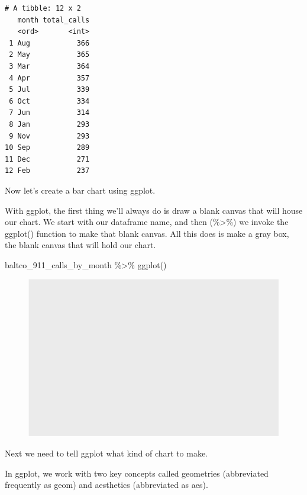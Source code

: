 \documentclass[
  letterpaper,
  DIV=11,
  numbers=noendperiod]{scrreprt}
\newenvironment{Shaded}{\begin{snugshade}}{\end{snugshade}}
\newcommand{\FunctionTok}[1]{\textcolor[rgb]{0.28,0.35,0.67}{#1}}
\newcommand{\NormalTok}[1]{\textcolor[rgb]{0.00,0.23,0.31}{#1}}
\newcommand{\SpecialCharTok}[1]{\textcolor[rgb]{0.37,0.37,0.37}{#1}}
\begin{document}
\begin{verbatim}
# A tibble: 12 x 2
   month total_calls
   <ord>       <int>
 1 Aug           366
 2 May           365
 3 Mar           364
 4 Apr           357
 5 Jul           339
 6 Oct           334
 7 Jun           314
 8 Jan           293
 9 Nov           293
10 Sep           289
11 Dec           271
12 Feb           237
\end{verbatim}

Now let's create a bar chart using ggplot.

With ggplot, the first thing we'll always do is draw a blank canvas that
will house our chart. We start with our dataframe name, and then
(\%\textgreater\%) we invoke the ggplot() function to make that blank
canvas. All this does is make a gray box, the blank canvas that will
hold our chart.

\begin{Shaded}
\begin{Highlighting}[]
\NormalTok{baltco\_911\_calls\_by\_month }\SpecialCharTok{\%\textgreater{}\%}
  \FunctionTok{ggplot}\NormalTok{()}
\end{Highlighting}
\end{Shaded}

\begin{figure}[H]

{\centering \includegraphics{./visualizing-for-reporting_files/figure-pdf/unnamed-chunk-4-1.pdf}

}

\end{figure}

Next we need to tell ggplot what kind of chart to make.

In ggplot, we work with two key concepts called geometries (abbreviated
frequently as geom) and aesthetics (abbreviated as aes).
\end{document}
